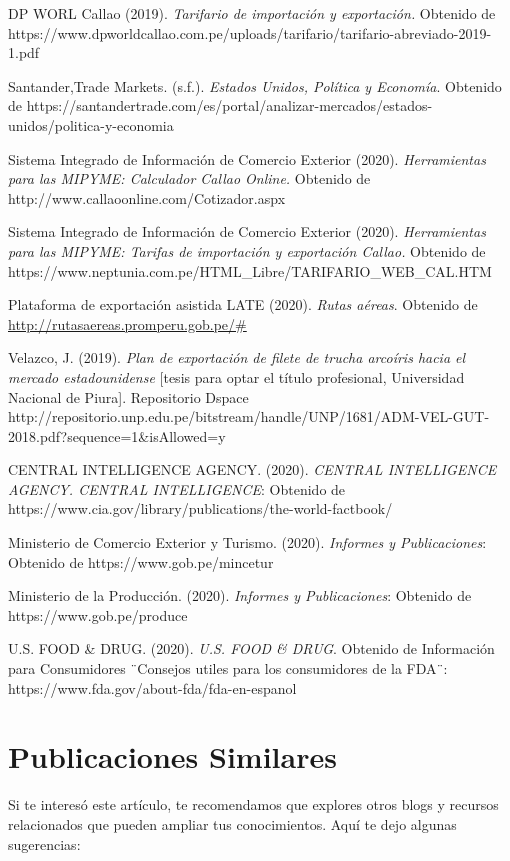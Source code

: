 \documentclass[
  stu,
  floatsintext,
  longtable,
  a4paper,
  nolmodern,
  notxfonts,
  notimes,
  12pt,
  colorlinks=true,linkcolor=blue,citecolor=blue,urlcolor=blue]{apa7}
\begin{document}
DP WORL Callao (2019). \emph{Tarifario de importación y exportación.}
Obtenido de
https://www.dpworldcallao.com.pe/uploads/tarifario/tarifario-abreviado-2019-1.pdf

Santander,Trade Markets. (s.f.). \emph{Estados Unidos, Política y
Economía}. Obtenido de
https://santandertrade.com/es/portal/analizar-mercados/estados-unidos/politica-y-economia

Sistema Integrado de Información de Comercio Exterior (2020).
\emph{Herramientas para las MIPYME: Calculador Callao Online.} Obtenido
de http://www.callaoonline.com/Cotizador.aspx

Sistema Integrado de Información de Comercio Exterior (2020).
\emph{Herramientas para las MIPYME: Tarifas de importación y exportación
Callao.} Obtenido de
https://www.neptunia.com.pe/HTML\_Libre/TARIFARIO\_WEB\_CAL.HTM

Plataforma de exportación asistida LATE (2020). \emph{Rutas aéreas}.
Obtenido de
\href{http://rutasaereas.promperu.gob.pe/}{http://rutasaereas.promperu.gob.pe/\#}

Velazco, J. (2019). \emph{Plan de exportación de filete de trucha
arcoíris hacia el mercado estadounidense} {[}tesis para optar el título
profesional, Universidad Nacional de Piura{]}. Repositorio Dspace
http://repositorio.unp.edu.pe/bitstream/handle/UNP/1681/ADM-VEL-GUT-2018.pdf?sequence=1\&isAllowed=y

CENTRAL INTELLIGENCE AGENCY. (2020). \emph{CENTRAL INTELLIGENCE AGENCY.
CENTRAL INTELLIGENCE}: Obtenido de
https://www.cia.gov/library/publications/the-world-factbook/

Ministerio de Comercio Exterior y Turismo. (2020). \emph{Informes y
Publicaciones}: Obtenido de https://www.gob.pe/mincetur

Ministerio de la Producción. (2020). \emph{Informes y Publicaciones}:
Obtenido de https://www.gob.pe/produce

U.S. FOOD \& DRUG. (2020). \emph{U.S. FOOD \& DRUG}. Obtenido de
Información para Consumidores ¨Consejos utiles para los consumidores de
la FDA¨: https://www.fda.gov/about-fda/fda-en-espanol

\section{Publicaciones Similares}\label{apx-publicaciones-similares}

Si te interesó este artículo, te recomendamos que explores otros blogs y
recursos relacionados que pueden ampliar tus conocimientos. Aquí te dejo
algunas sugerencias:
\end{document}
